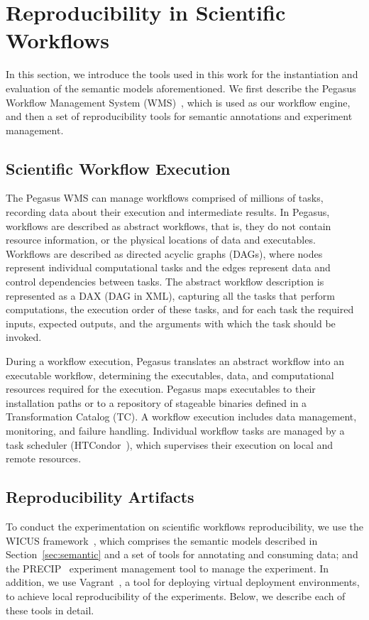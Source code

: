 \section{Reproducibility in Scientific Workflows}
\label{sec:reproducibility}

In this section, we introduce the tools used in this work for the instantiation and evaluation 
of the semantic models aforementioned. We first describe the Pegasus Workflow 
Management System (WMS)~\cite{Pegasus, Deelman-FGCS-2014}, which is used as our 
workflow engine, and then a set of reproducibility tools for semantic annotations and 
experiment management.


\subsection{Scientific Workflow Execution}

The Pegasus WMS can manage workflows comprised of millions of tasks, recording data 
about their execution and intermediate results. In Pegasus, workflows are described as 
abstract workflows, that is, they do not contain resource information, or the physical locations of 
data and executables. Workflows are described as directed acyclic graphs (DAGs), where 
nodes represent individual computational tasks and the edges represent data and control 
dependencies between tasks. The abstract workflow description is represented as a DAX 
(DAG in XML), capturing all the tasks that perform computations, the execution order of these 
tasks, and for each task the required inputs, expected outputs, and the arguments with which 
the task should be invoked. 

During a workflow execution, Pegasus translates an abstract workflow into an 
executable workflow, determining the executables, data, and computational resources 
required for the execution. Pegasus maps executables to their installation paths or to a 
repository of stageable binaries defined in a Transformation Catalog (TC). A workflow 
execution includes data management, monitoring, and failure handling. Individual workflow 
tasks are managed by a task scheduler (HTCondor~\cite{condor}), which supervises their 
execution on local and remote resources.


\subsection{Reproducibility Artifacts}

To conduct the experimentation on scientific workflows reproducibility, we 
use the WICUS framework~\cite{wicus}, which comprises the semantic models described 
in Section~\ref{sec:semantic} and a set of tools for annotating and consuming data; and 
the PRECIP~\cite{Azarnoosh-CRC-2013} experiment management tool to manage the 
experiment. In addition, we use Vagrant~\cite{palat2012introducing}, a tool for deploying virtual
deployment environments,  to achieve local reproducibility of the experiments. 
Below, we describe each of these tools in detail.


